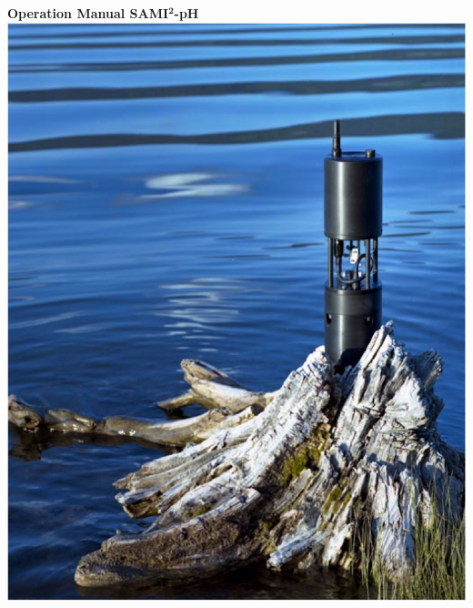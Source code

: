 \documentclass[twoside,letterpaper]{article}
\let\stdsection\section
\renewcommand\section{\newpage\stdsection}
\begin{document}

\let\oldsection\section
\def\section{\cleardoublepage\oldsection}

\begin{titlepage}
	\thispagestyle{empty}
		\begin{nolinenumbers}
           \vspace*{-3cm}
           \begin{center}
				{\Huge \textsf{\textbf{Operation Manual SAMI$\mathrm{^\textbf{2}}$-pH\\}}}
                \vspace{0.5cm}
                \includegraphics[scale=1.0]{figs/SAMItitle.png}
			\end{center}
			\vspace*{\fill}


\end{nolinenumbers}
\end{titlepage}
\end{document}
